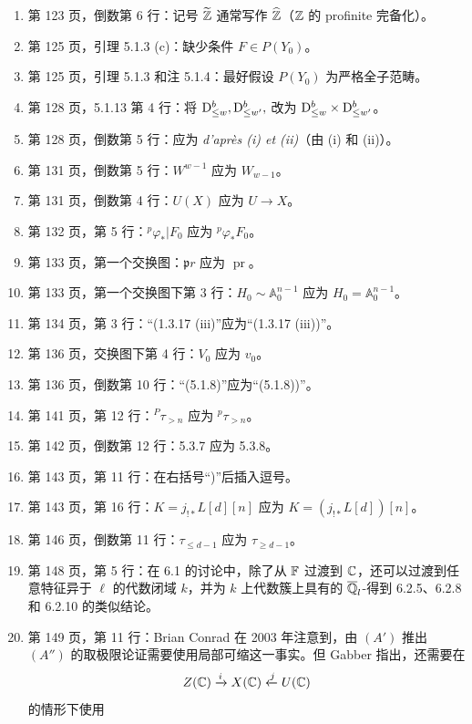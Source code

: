 \begin{enumerate}[label=\arabic*.,leftmargin=2.5em,itemsep=.65\baselineskip]
\item 第 123 页，倒数第 6 行：记号 $\widetilde{\mathbb Z}$ 通常写作 $\widehat{\mathbb Z}$（$\mathbb Z$ 的 profinite 完备化）。
\item 第 125 页，引理 5.1.3 (c)：缺少条件 $F\in P(Y_0)$。
\item 第 125 页，引理 5.1.3 和注 5.1.4：最好假设 $P(Y_0)$ 为严格全子范畴。
\item 第 128 页，5.1.13 第 4 行：将 $\mathrm{D}_{\le w}^b,\mathrm{D}_{\le w'}^b,$ 改为 $\mathrm{D}_{\le w}^b\times\mathrm{D}_{\le w'}^b$。
\item 第 128 页，倒数第 5 行：应为 \emph{d'après (i) et (ii)}（由 (i) 和 (ii)）。
\item 第 131 页，倒数第 5 行：$W^{w-1}$ 应为 $W_{w-1}$。
\item 第 131 页，倒数第 4 行：$U(X)$ 应为 $U\to X$。
\item 第 132 页，第 5 行：${}^p\varphi_*|F_0$ 应为 ${}^p\varphi_*F_0$。
\item 第 133 页，第一个交换图：$\mathfrak{p}r$ 应为 $\operatorname{pr}$。
\item 第 133 页，第一个交换图下第 3 行：$H_0\sim\mathbb A_0^{n-1}$ 应为 $H_0=\mathbb A_0^{n-1}$。
\item 第 134 页，第 3 行：“(1.3.17 (iii)”应为“(1.3.17 (iii))”。
\item 第 136 页，交换图下第 4 行：$V_0$ 应为 $v_0$。
\item 第 136 页，倒数第 10 行：“(5.1.8)”应为“(5.1.8))”。
\item 第 141 页，第 12 行：${}^P\tau_{>n}$ 应为 ${}^p\tau_{>n}$。
\item 第 142 页，倒数第 12 行：5.3.7 应为 5.3.8。
\item 第 143 页，第 11 行：在右括号“)”后插入逗号。
\item 第 143 页，第 16 行：$K=j_{!*}L[d][n]$ 应为 $K=(j_{!*}L[d])[n]$。
\item 第 146 页，倒数第 11 行：$\tau_{\le d-1}$ 应为 $\tau_{\ge d-1}$。
\item 第 148 页，第 5 行：在 6.1 的讨论中，除了从 $\mathbb F$ 过渡到 $\mathbb C$，还可以过渡到任意特征异于 $\ell$ 的代数闭域 $k$，并为 $k$ 上代数簇上具有的 $\overline{\mathbb Q}_l$-得到 6.2.5、6.2.8 和 6.2.10 的类似结论。
\item 第 149 页，第 11 行：Brian Conrad 在 2003 年注意到，由 $(A')$ 推出 $(A'')$ 的取极限论证需要使用局部可缩这一事实。但 Gabber 指出，还需要在
\[
Z(\mathbb C)\xrightarrow{i}X(\mathbb C)\xleftarrow{j}U(\mathbb C)
\]
的情形下使用

\end{enumerate}
